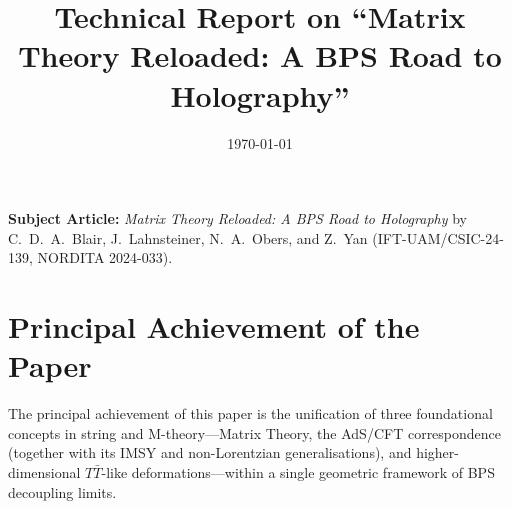\documentclass[11pt,a4paper]{article}
\title{\textbf{Technical Report on ``Matrix Theory Reloaded: A BPS Road to Holography''}}
\author{}
\date{\today}
\begin{document}
\maketitle

\noindent \textbf{Subject Article:} \emph{Matrix Theory Reloaded: A BPS Road to Holography} by C.~D.~A.~Blair, J.~Lahnsteiner, N.~A.~Obers, and Z.~Yan (IFT-UAM/CSIC-24-139, NORDITA 2024-033).

\section{Principal Achievement of the Paper}

The principal achievement of this paper is the unification of three foundational concepts in string and M-theory---Matrix Theory, the AdS/CFT correspondence (together with its IMSY and non-Lorentzian generalisations), and higher-dimensional $T\bar{T}$-like deformations---within a single geometric framework of BPS decoupling limits. 
\end{document}
